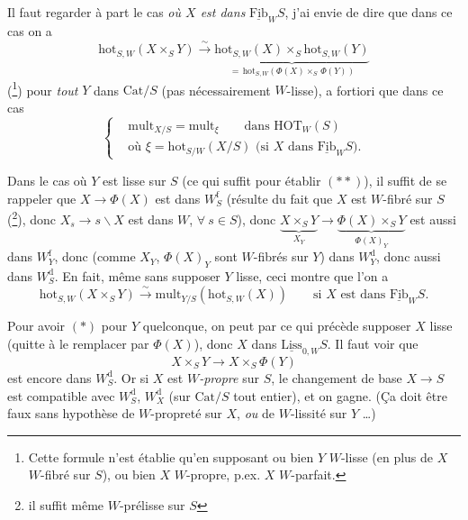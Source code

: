 Il faut regarder à part le cas \textit{où $X$ est dans} $\underline{\mathrm{Fib}}_W S$, j'ai envie de dire que dans ce cas on a
\[
\mathrm{hot}_{S,W}(X\times_S Y) \xrightarrow{\ \sim\ } \underbrace{\mathrm{hot}_{S,W}(X)\times_S \mathrm{hot}_{S,W}(Y)}_{=\,\mathrm{hot}_{S,W}(\Phi(X)\times_S\, \Phi(Y))} \tag*{$(*)$} %
\]
(\footnote{Cette formule n'est établie qu'en supposant ou bien $Y$ $W$-lisse (en plus de $X$ $W$-fibré sur $S$), ou bien $X$ $W$-propre, p.ex. $X$ $W$-parfait.}) pour \textit{tout} $Y$ dans $\mathrm{Cat}/S$ (pas nécessairement $W$-lisse), a fortiori que dans ce cas
\[
\left\{\begin{aligned}
&\mathrm{mult}_{X/S} = \mathrm{mult}_\xi \qquad \text{dans } \mathrm{HOT}_W(S)\\
&\text{où } \xi = \mathrm{hot}_{S/W}(X/S) \text{ (si $X$ dans $\underline{\mathrm{Fib}}_W S$).} %
\end{aligned}\right. \tag*{$(**)$}
\]


Dans le cas où $Y$ est lisse sur $S$ (ce qui suffit pour établir $(**)$), il suffit de se rappeler que $X\longrightarrow \Phi(X)$ est dans $W_S^{\mathrm{f}}$ (résulte du fait que $X$ est $W$-fibré sur $S$ (\footnote{il suffit même $W$-prélisse sur $S$}), donc $X_s \longrightarrow s\backslash X$ est dans $W$, $\forall\ s\in S$), donc $\underbrace{X\times_S Y}_{X_Y} \longrightarrow \underbrace{\Phi(X)\times_S Y}_{\Phi(X)_Y}$ est aussi dans $W_Y^{\mathrm{f}}$, donc (comme $X_Y$, $\Phi(X)_Y$ sont $W$-fibrés sur $Y$) dans $W_Y^{\mathrm{d}}$, donc aussi dans $W_S^{\mathrm{d}}$. En fait, même sans supposer $Y$ lisse, ceci montre que l'on a
\[
\mathrm{hot}_{S,W}(X\times_S Y) \xrightarrow{\ \sim\ } \mathrm{mult}_{Y/S}(\mathrm{hot}_{S,W}(X)) \qquad \text{si $X$ est dans $\underline{\mathrm{Fib}}_W S$.} \tag*{$(*)$}
\]

Pour avoir $(*)$ pour $Y$ quelconque, on peut par ce qui précède supposer $X$ lisse (quitte à le remplacer par $\Phi(X)$), donc $X$ dans $\underline{\mathrm{Liss}}_{0,W}S$. Il faut voir que
\[
X\times_S Y \longrightarrow X\times_S \Phi(Y)
\]
est encore dans $W_S^{\mathrm{d}}$. Or si $X$ est \textit{$W$-propre} sur $S$, le changement de base $X\longrightarrow S$ est compatible avec $W_S^{\mathrm{d}}$, $W_X^{\mathrm{d}}$ (sur $\mathrm{Cat}/S$ tout entier), et on gagne. (Ça doit être faux sans hypothèse de $W$-propreté sur $X$, \textit{ou} de $W$-lissité sur $Y$ \dots)

